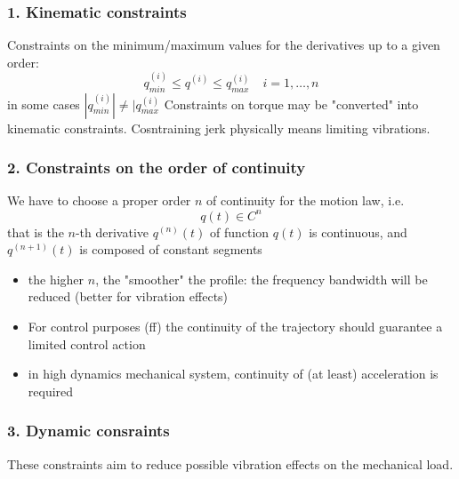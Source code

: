 \documentclass{book}
\begin{document}
\subsubsection{1. Kinematic constraints}
Constraints on the minimum/maximum values for the derivatives up to a given order:
\[
    q^{(i)}_{min}\leq q^{(i)}\leq q_{max}^{(i)} \quad i=1,\dots,n
\]
in some cases $|q_{min}^{(i)}|\neq |q_{max}^{(i)}$
Constraints on torque may be "converted" into kinematic constraints. Cosntraining jerk physically means limiting vibrations. 
\subsubsection{2. Constraints on the order of continuity}
We have to choose a proper order $n$ of continuity for the motion law, i.e. 
\[
    q(t)\in C^n
\]
that is the $n$-th derivative $q^{(n)}(t)$ of function $q(t)$ is continuous, and $q^{(n+1)}(t)$ is composed of constant segments
\begin{itemize}
    \item the higher $n$, the "smoother" the profile: the frequency bandwidth will be reduced (better for vibration effects) 
    \item For control purposes (ff) the continuity of the trajectory should guarantee a limited control action 
    \item in high dynamics mechanical system, continuity of (at least) acceleration is required
\end{itemize}
\subsubsection{3. Dynamic consraints}
These constraints aim to reduce possible vibration effects on the mechanical load. 
\end{document}
